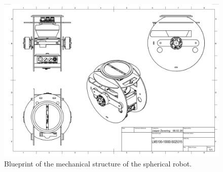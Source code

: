 \begin{figure}                                                                                                                                                                                                    
\centering                                                                                                                                                                                                        
\includegraphics[width=\textwidth]{../Media/BlueprintPNG.png}                                                                                                                                                      
\caption{Blueprint of the mechanical structure of the spherical robot.}                                                                                                                                   
\label{sec:TechnicalApproach:fig:blueprint}                                                                                                                                                                       
\end{figure}                                                                                                                                                                                                      
                                                                                                                                                                                                                  
